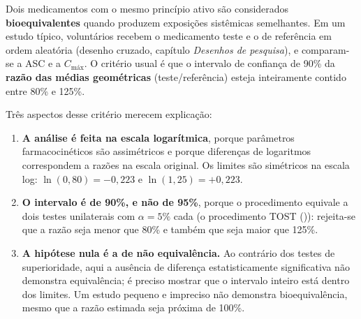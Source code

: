 \documentclass[
]{book}
\newenvironment{Shaded}{\begin{snugshade}}{\end{snugshade}}
\newcommand{\AttributeTok}[1]{\textcolor[rgb]{0.13,0.29,0.53}{#1}}
\newcommand{\DecValTok}[1]{\textcolor[rgb]{0.00,0.00,0.81}{#1}}
\newcommand{\FloatTok}[1]{\textcolor[rgb]{0.00,0.00,0.81}{#1}}
\newcommand{\FunctionTok}[1]{\textcolor[rgb]{0.13,0.29,0.53}{\textbf{#1}}}
\newcommand{\NormalTok}[1]{#1}
\newcommand{\OtherTok}[1]{\textcolor[rgb]{0.56,0.35,0.01}{#1}}
\newcommand{\SpecialCharTok}[1]{\textcolor[rgb]{0.81,0.36,0.00}{\textbf{#1}}}
\providecommand{\tightlist}{%
  \setlength{\itemsep}{0pt}\setlength{\parskip}{0pt}}
\begin{document}
Dois medicamentos com o mesmo princípio ativo são considerados \textbf{bioequivalentes} quando produzem exposições sistêmicas semelhantes. Em um estudo típico, voluntários recebem o medicamento teste e o de referência em ordem aleatória (desenho cruzado, capítulo \emph{Desenhos de pesquisa}), e comparam-se a ASC e a \(C_{\text{máx}}\). O critério usual é que o intervalo de confiança de 90\% da \textbf{razão das médias geométricas} (teste/referência) esteja inteiramente contido entre 80\% e 125\%.

Três aspectos desse critério merecem explicação:

\begin{enumerate}
\def\labelenumi{\arabic{enumi}.}
\tightlist
\item
  \textbf{A análise é feita na escala logarítmica}, porque parâmetros farmacocinéticos são assimétricos e porque diferenças de logaritmos correspondem a razões na escala original. Os limites são simétricos na escala log: \(\ln(0{,}80) = -0{,}223\) e \(\ln(1{,}25) = +0{,}223\).
\item
  \textbf{O intervalo é de 90\%, e não de 95\%}, porque o procedimento equivale a dois testes unilaterais com \(\alpha = 5\%\) cada (o procedimento TOST ()): rejeita-se que a razão seja menor que 80\% e também que seja maior que 125\%.
\item
  \textbf{A hipótese nula é a de não equivalência.} Ao contrário dos testes de superioridade, aqui a ausência de diferença estatisticamente significativa não demonstra equivalência; é preciso mostrar que o intervalo inteiro está dentro dos limites. Um estudo pequeno e impreciso não demonstra bioequivalência, mesmo que a razão estimada seja próxima de 100\%.
\end{enumerate}

\begin{Shaded}
\end{Shaded}
\end{document}
